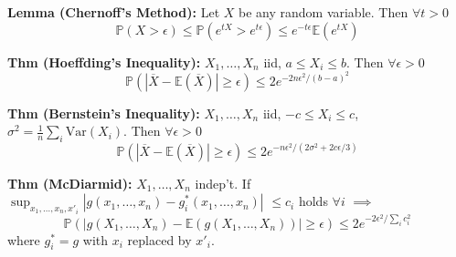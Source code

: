 \documentclass[10pt,twocolumn]{article}
\begin{document}
    \textbf{Lemma (Chernoff's Method):}
    Let $X$ be any random variable. Then $\forall t>0$
    \begin{equation}
        \mathbb{P}(X>\epsilon) \leq \mathbb{P}(e^{tX}>e^{t\epsilon}) \leq e^{-t\epsilon} \mathbb{E}(e^{tX})
    \end{equation}

    \textbf{Thm (Hoeffding's Inequality):}
    $X_{1},\ldots,X_{n}$ iid, $a \leq X_{i} \leq b$. Then $\forall \epsilon >0$
    \begin{equation}
        \mathbb{P}(|\overline{X} - \mathbb{E}(\overline{X})| \geq \epsilon) \leq 2e^{-2n\epsilon^{2}/(b-a)^{2}}
    \end{equation}

    \textbf{Thm (Bernstein's Inequality):}
    $X_{1},\ldots,X_{n}$ iid, $-c \leq X_{i} \leq c$, $\sigma^2 = \frac{1}{n}\sum_i \text{Var}(X_i)$. Then $\forall \epsilon >0$
    \begin{equation}
        \mathbb{P}(|\overline{X} - \mathbb{E}(\overline{X})| \geq \epsilon) \leq 2e^{-n\epsilon^2/(2\sigma^2 + 2c\epsilon/3)}
    \end{equation}

    \textbf{Thm (McDiarmid):} $X_{1},\ldots,X_{n}$ indep't. If\\
    $\sup_{x_{1},\ldots,x_{n},x'_{i}} \left| g(x_{1},\ldots,x_{n}) - g_{i}^{*}(x_{1},\ldots,x_{n}) \right|$ $\leq c_{i}$ holds $\forall i$ $\implies$
    \begin{equation}
        \mathbb{P} \left(\left| g(X_{1},\ldots,X_{n})-\mathbb{E}(g(X_{1},\ldots,X_{n})) \right| \geq \epsilon \right) \leq 2e^{-2\epsilon^{2}/\sum_{i}c_{i}^{2}}
    \end{equation}
    where $g_{i}^{*} = g$ with $x_{i}$ replaced by $x'_{i}$.
\end{document}
